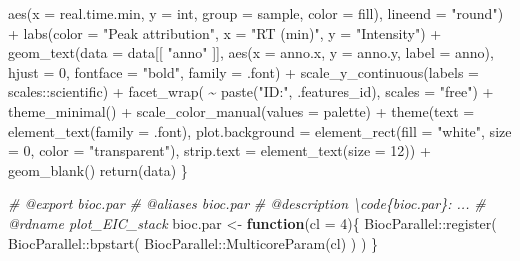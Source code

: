 \documentclass[
]{article}
\newenvironment{Shaded}{\begin{snugshade}}{\end{snugshade}}
\newcommand{\AttributeTok}[1]{\textcolor[rgb]{0.77,0.63,0.00}{#1}}
\newcommand{\CommentTok}[1]{\textcolor[rgb]{0.56,0.35,0.01}{\textit{#1}}}
\newcommand{\ControlFlowTok}[1]{\textcolor[rgb]{0.13,0.29,0.53}{\textbf{#1}}}
\newcommand{\DecValTok}[1]{\textcolor[rgb]{0.00,0.00,0.81}{#1}}
\newcommand{\FunctionTok}[1]{\textcolor[rgb]{0.00,0.00,0.00}{#1}}
\newcommand{\NormalTok}[1]{#1}
\newcommand{\OtherTok}[1]{\textcolor[rgb]{0.56,0.35,0.01}{#1}}
\newcommand{\SpecialCharTok}[1]{\textcolor[rgb]{0.00,0.00,0.00}{#1}}
\newcommand{\StringTok}[1]{\textcolor[rgb]{0.31,0.60,0.02}{#1}}
\begin{document}
\begin{Shaded}
\begin{Highlighting}[]
        \FunctionTok{aes}\NormalTok{(}\AttributeTok{x =}\NormalTok{ real.time.min,}
          \AttributeTok{y =}\NormalTok{ int,}
          \AttributeTok{group =}\NormalTok{ sample,}
          \AttributeTok{color =}\NormalTok{ fill),}
        \AttributeTok{lineend =} \StringTok{"round"}\NormalTok{) }\SpecialCharTok{+}
      \FunctionTok{labs}\NormalTok{(}\AttributeTok{color =} \StringTok{"Peak attribution"}\NormalTok{, }\AttributeTok{x =} \StringTok{"RT (min)"}\NormalTok{, }\AttributeTok{y =} \StringTok{"Intensity"}\NormalTok{) }\SpecialCharTok{+}
      \FunctionTok{geom\_text}\NormalTok{(}\AttributeTok{data =}\NormalTok{ data[[ }\StringTok{"anno"}\NormalTok{ ]],}
        \FunctionTok{aes}\NormalTok{(}\AttributeTok{x =}\NormalTok{ anno.x, }\AttributeTok{y =}\NormalTok{ anno.y, }\AttributeTok{label =}\NormalTok{ anno),}
        \AttributeTok{hjust =} \DecValTok{0}\NormalTok{, }\AttributeTok{fontface =} \StringTok{"bold"}\NormalTok{, }\AttributeTok{family =}\NormalTok{ .font) }\SpecialCharTok{+}
      \FunctionTok{scale\_y\_continuous}\NormalTok{(}\AttributeTok{labels =}\NormalTok{ scales}\SpecialCharTok{::}\NormalTok{scientific) }\SpecialCharTok{+}
      \FunctionTok{facet\_wrap}\NormalTok{( }\SpecialCharTok{\textasciitilde{}} \FunctionTok{paste}\NormalTok{(}\StringTok{"ID:"}\NormalTok{, .features\_id), }\AttributeTok{scales =} \StringTok{"free"}\NormalTok{) }\SpecialCharTok{+}
      \FunctionTok{theme\_minimal}\NormalTok{() }\SpecialCharTok{+}
      \FunctionTok{scale\_color\_manual}\NormalTok{(}\AttributeTok{values =}\NormalTok{ palette) }\SpecialCharTok{+}
      \FunctionTok{theme}\NormalTok{(}\AttributeTok{text =} \FunctionTok{element\_text}\NormalTok{(}\AttributeTok{family =}\NormalTok{ .font),}
        \AttributeTok{plot.background =} \FunctionTok{element\_rect}\NormalTok{(}\AttributeTok{fill =} \StringTok{"white"}\NormalTok{, }\AttributeTok{size =} \DecValTok{0}\NormalTok{, }\AttributeTok{color =} \StringTok{"transparent"}\NormalTok{),}
        \AttributeTok{strip.text =} \FunctionTok{element\_text}\NormalTok{(}\AttributeTok{size =} \DecValTok{12}\NormalTok{)) }\SpecialCharTok{+}
      \FunctionTok{geom\_blank}\NormalTok{()}
    \FunctionTok{return}\NormalTok{(data)}
\NormalTok{  \}}

\CommentTok{\#\textquotesingle{} @export bioc.par}
\CommentTok{\#\textquotesingle{} @aliases bioc.par}
\CommentTok{\#\textquotesingle{} @description \textbackslash{}code\{bioc.par\}: ...}
\CommentTok{\#\textquotesingle{} @rdname plot\_EIC\_stack}
\NormalTok{bioc.par }\OtherTok{\textless{}{-}}
  \ControlFlowTok{function}\NormalTok{(}\AttributeTok{cl =} \DecValTok{4}\NormalTok{)\{}
\NormalTok{    BiocParallel}\SpecialCharTok{::}\FunctionTok{register}\NormalTok{(}
\NormalTok{      BiocParallel}\SpecialCharTok{::}\FunctionTok{bpstart}\NormalTok{(}
\NormalTok{        BiocParallel}\SpecialCharTok{::}\FunctionTok{MulticoreParam}\NormalTok{(cl)}
\NormalTok{      )}
\NormalTok{    )}
\NormalTok{  \}}
\end{Highlighting}
\end{Shaded}
\end{document}
